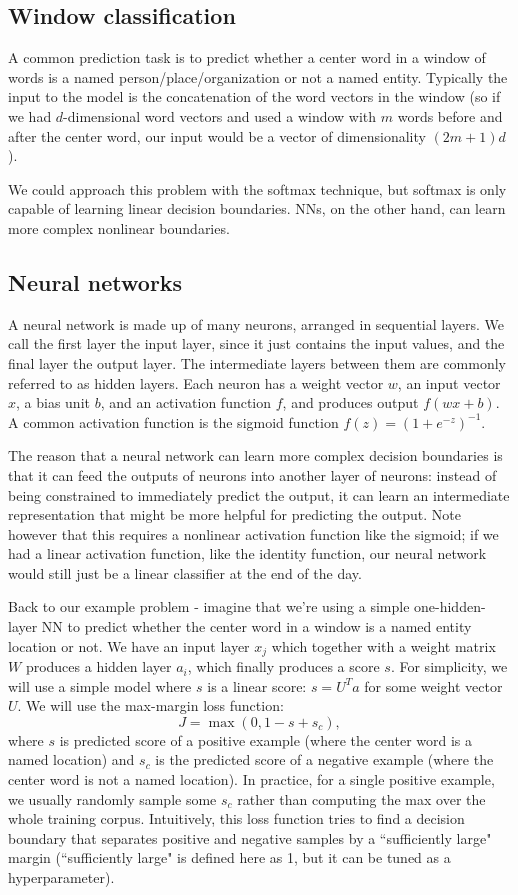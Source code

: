 \subsection{Window classification}
A common prediction task is to predict whether a center word in a window of words is a named person/place/organization or not a named entity. Typically the input to the model is the concatenation of the word vectors in the window (so if we had $d$-dimensional word vectors and used a window with $m$ words before and after the center word, our input would be a vector of dimensionality $(2m + 1)d$). 

We could approach this problem with the softmax technique, but softmax is only capable of learning linear decision boundaries. NNs, on the other hand, can learn more complex nonlinear boundaries.

\subsection{Neural networks}
A neural network is made up of many neurons, arranged in sequential layers. We call the first layer the input layer, since it just contains the input values, and the final layer the output layer. The intermediate layers between them are commonly referred to as hidden layers. Each neuron has a weight vector $w$, an input vector $x$, a bias unit $b$, and an activation function $f$, and produces output $f(wx + b)$. A common activation function is the sigmoid function $f(z) = (1 + e^{-z})^{-1}$.

The reason that a neural network can learn more complex decision boundaries is that it can feed the outputs of neurons into another layer of neurons: instead of being constrained to immediately predict the output, it can learn an intermediate representation that might be more helpful for predicting the output. Note however that this requires a nonlinear activation function like the sigmoid; if we had a linear activation function, like the identity function, our neural network would still just be a linear classifier at the end of the day.

Back to our example problem - imagine that we're using a simple one-hidden-layer NN to predict whether the center word in a window is a named entity location or not. We have an input layer $x_j$ which together with a weight matrix $W$ produces a hidden layer $a_i$, which finally produces a score $s$. For simplicity, we will use a simple model where $s$ is a linear score: $s = U^Ta$ for some weight vector $U$. We will use the max-margin loss function:
$$J = \max\left(0, 1 - s + s_c\right),$$
where $s$ is predicted score of a positive example (where the center word is a named location) and $s_c$ is the predicted score of a negative example (where the center word is not a named location). In practice, for a single positive example, we usually randomly sample some $s_c$ rather than computing the max over the whole training corpus. Intuitively, this loss function tries to find a decision boundary that separates positive and negative samples by a ``sufficiently large" margin (``sufficiently large" is defined here as 1, but it can be tuned as a hyperparameter).

